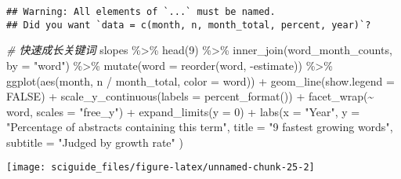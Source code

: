 \documentclass[]{tufte-book}
\newenvironment{Shaded}{}{}
\newcommand{\AttributeTok}[1]{\textcolor[rgb]{0.49,0.56,0.16}{#1}}
\newcommand{\CommentTok}[1]{\textcolor[rgb]{0.38,0.63,0.69}{\textit{#1}}}
\newcommand{\ConstantTok}[1]{\textcolor[rgb]{0.53,0.00,0.00}{#1}}
\newcommand{\DecValTok}[1]{\textcolor[rgb]{0.25,0.63,0.44}{#1}}
\newcommand{\FunctionTok}[1]{\textcolor[rgb]{0.02,0.16,0.49}{#1}}
\newcommand{\NormalTok}[1]{#1}
\newcommand{\SpecialCharTok}[1]{\textcolor[rgb]{0.25,0.44,0.63}{#1}}
\newcommand{\StringTok}[1]{\textcolor[rgb]{0.25,0.44,0.63}{#1}}
\begin{document}
\begin{verbatim}
## Warning: All elements of `...` must be named.
## Did you want `data = c(month, n, month_total, percent, year)`?
\end{verbatim}

\begin{Shaded}
\begin{Highlighting}[]
\CommentTok{\# 快速成长关键词}
\NormalTok{slopes }\SpecialCharTok{\%\textgreater{}\%}
  \FunctionTok{head}\NormalTok{(}\DecValTok{9}\NormalTok{) }\SpecialCharTok{\%\textgreater{}\%}
  \FunctionTok{inner\_join}\NormalTok{(word\_month\_counts, }\AttributeTok{by =} \StringTok{"word"}\NormalTok{) }\SpecialCharTok{\%\textgreater{}\%}
  \FunctionTok{mutate}\NormalTok{(}\AttributeTok{word =} \FunctionTok{reorder}\NormalTok{(word, }\SpecialCharTok{{-}}\NormalTok{estimate)) }\SpecialCharTok{\%\textgreater{}\%}
  \FunctionTok{ggplot}\NormalTok{(}\FunctionTok{aes}\NormalTok{(month, n }\SpecialCharTok{/}\NormalTok{ month\_total, }\AttributeTok{color =}\NormalTok{ word)) }\SpecialCharTok{+}
  \FunctionTok{geom\_line}\NormalTok{(}\AttributeTok{show.legend =} \ConstantTok{FALSE}\NormalTok{) }\SpecialCharTok{+}
  \FunctionTok{scale\_y\_continuous}\NormalTok{(}\AttributeTok{labels =} \FunctionTok{percent\_format}\NormalTok{()) }\SpecialCharTok{+}
  \FunctionTok{facet\_wrap}\NormalTok{(}\SpecialCharTok{\textasciitilde{}}\NormalTok{ word, }\AttributeTok{scales =} \StringTok{"free\_y"}\NormalTok{) }\SpecialCharTok{+}
  \FunctionTok{expand\_limits}\NormalTok{(}\AttributeTok{y =} \DecValTok{0}\NormalTok{) }\SpecialCharTok{+}
  \FunctionTok{labs}\NormalTok{(}\AttributeTok{x =} \StringTok{"Year"}\NormalTok{,}
       \AttributeTok{y =} \StringTok{"Percentage of abstracts containing this term"}\NormalTok{,}
       \AttributeTok{title =} \StringTok{"9 fastest growing words"}\NormalTok{,}
       \AttributeTok{subtitle =} \StringTok{"Judged by growth rate"}
\NormalTok{              )}
\end{Highlighting}
\end{Shaded}

\texttt{[image: sciguide\_files/figure-latex/unnamed-chunk-25-2]}
\end{document}
